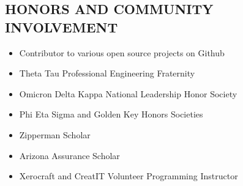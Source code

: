 \documentclass{res}
\begin{document}
\begin{resume}
\section{HONORS AND COMMUNITY INVOLVEMENT}
  \begin{itemize} \itemsep -2pt %
    \item Contributor to various open source projects on Github 
    \item Theta Tau Professional Engineering Fraternity
    \item Omicron Delta Kappa National Leadership Honor Society
    \item Phi Eta Sigma and Golden Key Honors Societies
    \item Zipperman Scholar
    \item Arizona Assurance Scholar
    \item Xerocraft and CreatIT Volunteer Programming Instructor
  \end{itemize}

\end{resume}
\end{document}
